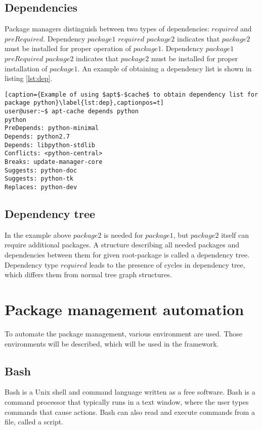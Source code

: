 \subsection*{Dependencies} \label{subs:dep}
Package managers distinguish between two types of dependencies: $required$ and $preRequired$.
Dependency $package1$ $required$ $package2$ indicates that $package2$ must be installed for proper operation of $package1$.
Dependency $package1$ $preRequired$ $package2$ indicates that $package2$ must be installed for proper installation of $package1$.
An example of obtaining a dependency list is shown in listing \ref{lst:dep}.
\begin{lstlisting}[caption={Example of using $apt$-$cache$ to obtain dependency list for package python}\label{lst:dep},captionpos=t] 
user@user:~$ apt-cache depends python
python
PreDepends: python-minimal
Depends: python2.7
Depends: libpython-stdlib
Conflicts: <python-central>
Breaks: update-manager-core
Suggests: python-doc
Suggests: python-tk
Replaces: python-dev
\end{lstlisting}
\subsection*{Dependency tree}
In the example above $package2$ is needed for $package1$, but $package2$ itself can require additional packages.
A structure describing all needed packages and dependencies between them for given root-package is called a dependency tree. 
Dependency type $required$ leads to the presence of cycles in dependency tree, which differs them from normal tree graph structures.

\section{Package management automation}
To automate the package management, various environment are used. 
Those environments will be described, which will be used in the framework.
\subsection{Bash} \label{lang:bash}
Bash is a Unix shell and command language written as a free software.
Bash is a command processor that typically runs in a text window, where the user types commands that cause actions.
Bash can also read and execute commands from a file, called a script. \cite{bash}
